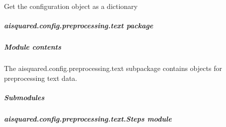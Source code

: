 \documentclass[letterpaper,10pt,english]{sphinxmanual}
\begin{document}
\begin{fulllineitems}

\begin{fulllineitems}
\label{\detokenize{aisquared.config.preprocessing.tabular:aisquared.config.preprocessing.tabular.TabularPreprocessing.TabularPreprocessor.to_dict}}
\pysigstartsignatures
{}
\pysigstopsignatures
\sphinxAtStartPar
Get the configuration object as a dictionary

\end{fulllineitems}


\end{fulllineitems}


\sphinxstepscope


\subparagraph{aisquared.config.preprocessing.text package}
\label{\detokenize{aisquared.config.preprocessing.text:aisquared-config-preprocessing-text-package}}\label{\detokenize{aisquared.config.preprocessing.text::doc}}

\subparagraph{Module contents}
\label{\detokenize{aisquared.config.preprocessing.text:module-aisquared.config.preprocessing.text}}\label{\detokenize{aisquared.config.preprocessing.text:module-contents}}
\sphinxAtStartPar
The aisquared.config.preprocessing.text subpackage contains objects for preprocessing text data.


\subparagraph{Submodules}
\label{\detokenize{aisquared.config.preprocessing.text:submodules}}

\subparagraph{aisquared.config.preprocessing.text.Steps module}
\label{\detokenize{aisquared.config.preprocessing.text:module-aisquared.config.preprocessing.text.Steps}}\label{\detokenize{aisquared.config.preprocessing.text:aisquared-config-preprocessing-text-steps-module}}
\end{document}
